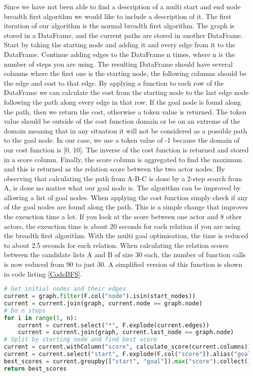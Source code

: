 Since we have not been able to find a description of a multi start and end node breadth first algorithm we would like to include a description of it. The first iteration of our algorithm is the normal breadth first algorithm. The graph is stored in a DataFrame, and the current paths are stored in another DataFrame. Start by taking the starting node and adding it and every edge from it to the DataFrame. Continue adding edges to the DataFrame n times, where n is the number of steps you are using. The resulting DataFrame should have several columns where the first one is the starting node, the following columns should be the edge and cost to that edge. By applying a function to each row of the DataFrame we can calculate the cost from the starting node to the last edge node following the path along every edge in that row. If the goal node is found along the path, then we return the cost, otherwise a token value is returned. The token value should be outside of the cost function domain or be on an extreme of the domain meaning that in any situation it will not be considered as a possible path to the goal node. In our case, we use a token value of -1 because the domain of our cost function is [0, 10]. The inverse of the cost function is returned and stored in a score column. Finally, the score column is aggregated to find the maximum and this is returned as the relation score between the two actor nodes. By observing that calculating the path from A-B-C is done by a 2-step search from A, is done no matter what our goal node is. The algorithm can be improved by allowing a list of goal nodes. When applying the cost function simply check if any of the goal nodes are found along the path. This is a simple change that improves the exeuction time a lot. If you look at the score between one actor and 8 other actors, the exeuction time is about 20 seconds for each relation if you are using the breadth first algorithm. With the multi goal optimisation, the time is reduced to about 2.5 seconds for each relation. When calculating the relation scores between the candidate lists A and B of size 30 each, the number of function calls is now reduced from 90 to just 30. A simplified version of this function is shown in code listing \ref{CodeBFS}.

\begin{lstlisting}[language=Python, caption=Simplified multi-start to multi-goal search algorithm, label=CodeBFS, breaklines=true]
# Get initial nodes and their edges
current = graph.filter(F.col("node").isin(start_nodes))
current = current.join(graph, current.node == graph.node)
# Do n steps
for i in range(1, n):
    current = current.select("*", F.explode(current.edges))
    current = current.join(graph, current.last_node == graph.node)
# Split by starting node and find best score
current = current.withColumn("score", calculate_score(current.columns))
current = current.select("start", F.explode(F.col("score")).alias("goal", "score"))
best_scores = current.groupby(["start", "goal"]).max("score").collect()
return best_scores
\end{lstlisting}

